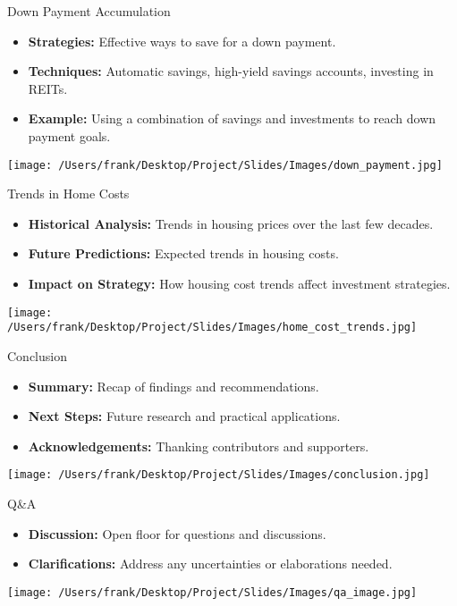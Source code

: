\documentclass{beamer}
\begin{document}
\begin{frame}{Down Payment Accumulation}
    \begin{itemize}
        \item \textbf{Strategies:} Effective ways to save for a down payment.
        \item \textbf{Techniques:} Automatic savings, high-yield savings accounts, investing in REITs.
        \item \textbf{Example:} Using a combination of savings and investments to reach down payment goals.
    \end{itemize}
    \centering
    \texttt{[image: /Users/frank/Desktop/Project/Slides/Images/down\_payment.jpg]}
\end{frame}

\begin{frame}{Trends in Home Costs}
    \begin{itemize}
        \item \textbf{Historical Analysis:} Trends in housing prices over the last few decades.
        \item \textbf{Future Predictions:} Expected trends in housing costs.
        \item \textbf{Impact on Strategy:} How housing cost trends affect investment strategies.
    \end{itemize}
    \centering
    \texttt{[image: /Users/frank/Desktop/Project/Slides/Images/home\_cost\_trends.jpg]}
\end{frame}

\begin{frame}{Conclusion}
    \begin{itemize}
        \item \textbf{Summary:} Recap of findings and recommendations.
        \item \textbf{Next Steps:} Future research and practical applications.
        \item \textbf{Acknowledgements:} Thanking contributors and supporters.
    \end{itemize}
    \centering
    \texttt{[image: /Users/frank/Desktop/Project/Slides/Images/conclusion.jpg]}
\end{frame}

\begin{frame}{Q&A}
    \begin{itemize}
        \item \textbf{Discussion:} Open floor for questions and discussions.
        \item \textbf{Clarifications:} Address any uncertainties or elaborations needed.
    \end{itemize}
    \centering
    \texttt{[image: /Users/frank/Desktop/Project/Slides/Images/qa\_image.jpg]}
\end{frame}
\end{document}
